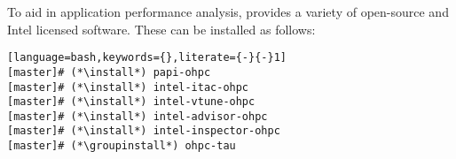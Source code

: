 To aid in application performance analysis, \OHPC{} provides a variety of
open-source and Intel licensed software. These can be installed as follows:

\begin{lstlisting}[language=bash,keywords={},literate={-}{-}1]
[master]# (*\install*) papi-ohpc
[master]# (*\install*) intel-itac-ohpc
[master]# (*\install*) intel-vtune-ohpc
[master]# (*\install*) intel-advisor-ohpc
[master]# (*\install*) intel-inspector-ohpc
[master]# (*\groupinstall*) ohpc-tau
\end{lstlisting}
